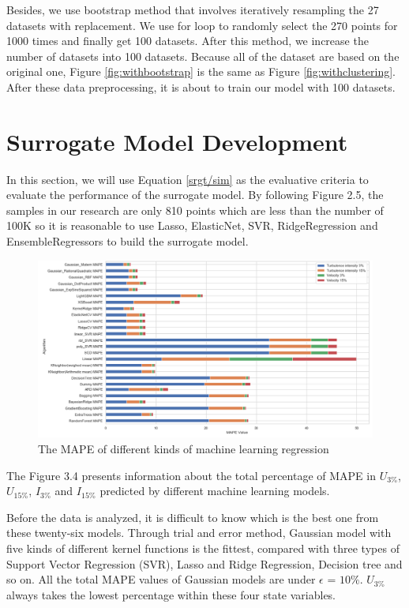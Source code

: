 Besides, we use bootstrap method that involves iteratively resampling the 27 datasets with replacement. We use for loop to randomly select the 270 points for 1000 times and finally get 100 datasets. After this method, we increase the number of datasets into 100 datasets. Because all of the dataset are based on the original one, Figure \ref{fig:withbootstrap} is the same as Figure \ref{fig:withclustering}. After these data preprocessing, it is about to train our model with 100 datasets. 

\section{Surrogate Model Development}
In this section, we will use Equation \ref{srgt/sim} as the evaluative criteria to evaluate the performance of the surrogate model. By following Figure 2.5, the samples in our research are only 810 points which are less than the number of 100K so it is reasonable to use Lasso, ElasticNet, SVR, RidgeRegression and EnsembleRegressors to build the surrogate model.

\begin{flushleft}
\begin{figure}[h]
	\flushleft
	\includegraphics[width=1.2\textwidth]{images/regr.png}
	\begin{flushright}
		\caption{The MAPE of different kinds of machine learning regression}
	\end{flushright}
	\label{fig:MAPEregression}
\end{figure}
\end{flushleft}

The Figure 3.4 presents information about the total percentage of MAPE in $U_{3{\%}}$, $U_{15{\%}}$, $I_{3{\%}}$ and $I_{15{\%}}$ predicted by different machine learning models. 

Before the data is analyzed, it is difficult to know which is the best one from these twenty-six models. Through trial and error method, Gaussian model with five kinds of different kernel functions is the fittest, compared with three types of Support Vector Regression (SVR), Lasso and Ridge Regression, Decision tree and so on. All the total MAPE values of Gaussian models are under $\epsilon$ = ${10{\%}}$. $U_{3{\%}}$ always takes the lowest percentage within these four state variables. 

